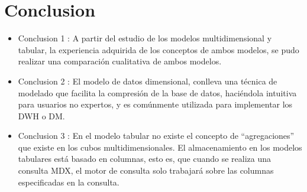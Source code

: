 \documentclass[11pt,a4paper]{article}
\begin{document}
	\newpage
	 
	 \section{Conclusion}
\begin{itemize}
\item Conclusion 1 : A partir del estudio de los modelos multidimensional y tabular, la experiencia adquirida de los conceptos de ambos modelos, se pudo realizar  una  comparación  cualitativa  de  ambos modelos. 
\item Conclusion 2 : El modelo de datos dimensional, conlleva una técnica de modelado que facilita la compresión de la base de datos, haciéndola intuitiva para usuarios no expertos, y es comúnmente utilizada para implementar los DWH o DM.
\item Conclusion 3 : En el modelo tabular no existe el concepto de “agregaciones” que existe en los cubos multidimensionales. El almacenamiento en los modelos tabulares está basado en columnas, esto es, que cuando se realiza una consulta MDX, el motor de consulta solo trabajará sobre las columnas especificadas en la consulta.

\end{itemize}	
	 	
	
	
	
	
\end{document}
